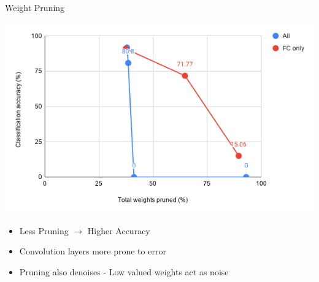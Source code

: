 \begin{frame}{Weight Pruning}
	\begin{minipage}{0.6\textwidth}
		\centering
		\includegraphics[width=\textwidth]{../Images/Weights-distributions/pruned/pruning-amount-vs-accuracy-chart.png}\\
	\end{minipage}%
	\begin{minipage}{0.4\textwidth}
		\begin{itemize}
			\item Less Pruning $\rightarrow$ Higher Accuracy
			\item Convolution layers more prone to error
			\item Pruning also denoises - Low valued weights act as noise
		\end{itemize}
	\end{minipage}
\end{frame}

